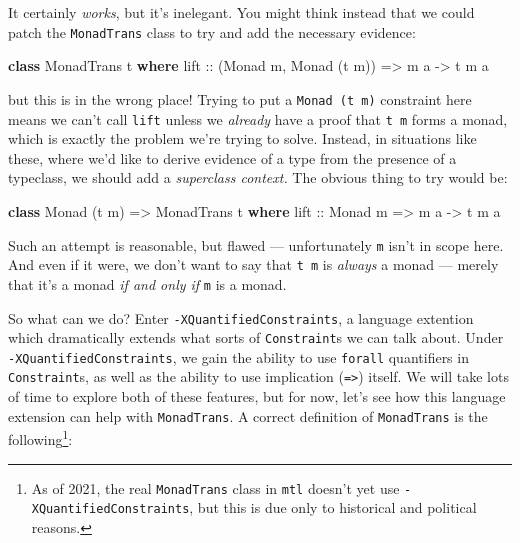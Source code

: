 \documentclass[
  11pt,
]{book}
\newenvironment{Shaded}{}{}
\newcommand{\DataTypeTok}[1]{\textcolor[rgb]{0.56,0.13,0.00}{#1}}
\newcommand{\KeywordTok}[1]{\textcolor[rgb]{0.00,0.44,0.13}{\textbf{#1}}}
\newcommand{\NormalTok}[1]{#1}
\newcommand{\OtherTok}[1]{\textcolor[rgb]{0.00,0.44,0.13}{#1}}
\theoremstyle{nonumberplain}
\begin{document}
It certainly \emph{works}, but it's inelegant. You might think instead
that we could patch the \texttt{MonadTrans} class to try and add the
necessary evidence:

\begin{Shaded}
\begin{Highlighting}[]
\KeywordTok{class} \DataTypeTok{MonadTrans}\NormalTok{ t }\KeywordTok{where}
\OtherTok{  lift ::}\NormalTok{ (}\DataTypeTok{Monad}\NormalTok{ m, }\DataTypeTok{Monad}\NormalTok{ (t m)) }\OtherTok{=\textgreater{}}\NormalTok{ m a }\OtherTok{{-}\textgreater{}}\NormalTok{ t m a}
\end{Highlighting}
\end{Shaded}

\noindent but this is in the wrong place! Trying to put a
\texttt{Monad\ (t\ m)} constraint here means we can't call \texttt{lift}
unless we \emph{already} have a proof that \texttt{t\ m} forms a monad,
which is exactly the problem we're trying to solve. Instead, in
situations like these, where we'd like to derive evidence of a type from
the presence of a typeclass, we should add a \emph{superclass context.}
The obvious thing to try would be:

\begin{Shaded}
\begin{Highlighting}[]
\KeywordTok{class} \DataTypeTok{Monad}\NormalTok{ (t m) }\OtherTok{=\textgreater{}} \DataTypeTok{MonadTrans}\NormalTok{ t }\KeywordTok{where}
\OtherTok{  lift ::} \DataTypeTok{Monad}\NormalTok{ m }\OtherTok{=\textgreater{}}\NormalTok{ m a }\OtherTok{{-}\textgreater{}}\NormalTok{ t m a}
\end{Highlighting}
\end{Shaded}

Such an attempt is reasonable, but flawed --- unfortunately \texttt{m}
isn't in scope here. And even if it were, we don't want to say that
\texttt{t\ m} is \emph{always} a monad --- merely that it's a monad
\emph{if and only if} \texttt{m} is a monad.

So what can we do? Enter \texttt{-XQuantifiedConstraints}, a language
extention which dramatically extends what sorts of \texttt{Constraint}s
we can talk about. Under \texttt{-XQuantifiedConstraints}, we gain the
ability to use \texttt{forall} quantifiers in \texttt{Constraint}s, as
well as the ability to use implication (\texttt{=\textgreater{}})
itself. We will take lots of time to explore both of these features, but
for now, let's see how this language extension can help with
\texttt{MonadTrans}. A correct definition of \texttt{MonadTrans} is the
following\footnote{As of 2021, the real \texttt{MonadTrans} class in
  \texttt{mtl} doesn't yet use \texttt{-XQuantifiedConstraints}, but
  this is due only to historical and political reasons.}:
\end{document}
